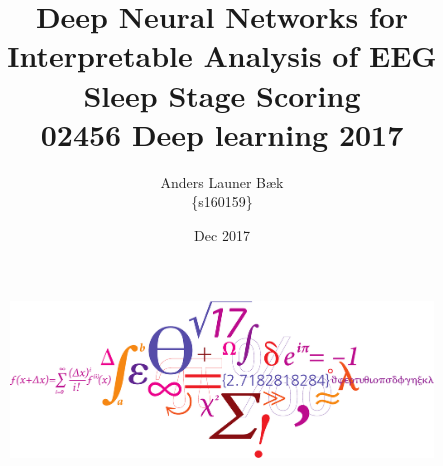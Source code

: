 \title{Deep Neural Networks for Interpretable Analysis of EEG Sleep Stage Scoring \\ 02456 Deep learning 2017}
\author{Anders Launer Bæk \\\{s160159\}}
\date{Dec 2017}
\begin{figure}
\centering
\vspace{60 mm}
\includegraphics[width=1\textwidth]{figures/tex_dtu_frise.pdf}
\end{figure}
\maketitle